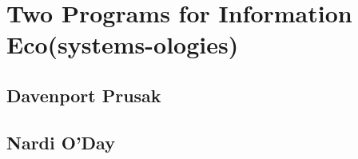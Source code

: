 \section{Two Programs for Information Eco(systems-ologies)}

\subsection{Davenport Prusak}

\subsection{Nardi O'Day}